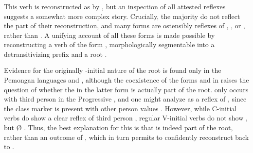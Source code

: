 
%

\subsubsection{ }
\label{sec:come}



This verb is reconstructed as  by \textcite[30]{gildea2007greenberg}, but an inspection of all attested reflexes  suggests a somewhat more complex story.
Crucially, the majority do not reflect the  part of their reconstruction, and many forms are ostensibly reflexes of , , or , rather than .
A unifying account of all these forms is made possible by reconstructing a \PC verb of the form , morphologically segmentable into a detransitivizing prefix and a root .

Evidence for the originally -initial nature of the root is found only in the Pemongan languages and \kaxui, although the coexistence of the forms  and  in \kaxui raises the question of whether the  in the latter form is actually part of the root.
 only occurs with third person in the Progressive , and one might analyze  as a reflex of  , since the  class marker  is present with other person values .
However, while C-initial verbs do show a clear reflex of third person  , regular V-initial  verbs do not show , but Ø .
Thus, the best explanation for this  is that is indeed part of the root, rather than an outcome of , which in turn permits to confidently reconstruct  back to \PC.

